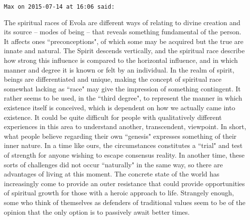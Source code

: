 \begin{footnotesize}
\begin{sffamily}
\hfill

\texttt{Max on 2015-07-14 at 16:06 said: }

The spiritual races of Evola are different ways of relating to divine creation and its source – modes of being – that reveals something fundamental of the person. It affects ones ``preconceptions", of which some may be acquired but the true are innate and natural. The Spirit descends vertically, and the spiritual race describe how strong this influence is compared to the horizontal influence, and in which manner and degree it is known or felt by an individual. In the realm of spirit, beings are differentiated and unique, making the concept of spiritual race somewhat lacking as ``race" may give the impression of something contingent. It rather seems to be used, in the ``third degree", to represent the manner in which existence itself is conceived, which is dependent on how we actually came into existence. It could be quite difficult for people with qualitatively different experiences in this area to understand another, transcendent, viewpoint. In short, what people believe regarding their own ``genesis" expresses something of their inner nature. In a time like ours, the circumstances constitutes a ``trial" and test of strength for anyone wishing to escape consensus reality. In another time, these sorts of challenges did not occur ``naturally" in the same way, so there are advantages of living at this moment. The concrete state of the world has increasingly come to provide an outer resistance that could provide opportunities of spiritual growth for those with a heroic approach to life. Strangely enough, some who think of themselves as defenders of traditional values seem to be of the opinion that the only option is to passively await better times.


\end{sffamily}
\end{footnotesize}
